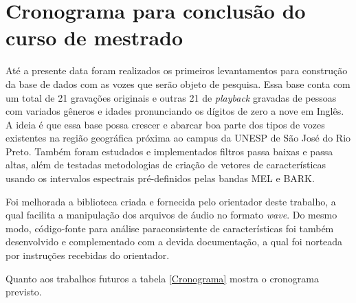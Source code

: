 \chapter{Cronograma para conclusão do curso de mestrado}
	\begin{myenv}{1.5}
		\par Até a presente data foram realizados os primeiros levantamentos para construção da base de dados com as vozes que serão objeto de pesquisa. Essa base conta com um total de 21 gravações originais e outras 21 de \textit{playback} gravadas de pessoas com variados gêneros e idades pronunciando os dígitos de zero a nove em Inglês. A ideia é que essa base possa crescer e abarcar boa parte dos tipos de vozes existentes na região geográfica próxima ao campus da UNESP de São José do Rio Preto. Também foram estudados e implementados filtros passa baixas e passa altas, além de testadas metodologias de criação de vetores de características usando os intervalos espectrais pré-definidos pelas bandas MEL e BARK. 
		\par Foi melhorada a biblioteca criada e fornecida pelo orientador deste trabalho, a qual facilita a manipulação dos arquivos de áudio no formato \textit{wave}. Do mesmo modo, código-fonte para análise paraconsistente de características foi também desenvolvido e complementado com a devida documentação, a qual foi norteada por instruções recebidas do orientador.
		\par Quanto aos trabalhos futuros a tabela \ref{Cronograma} mostra o cronograma previsto.
		
		\newcommand\ytl[2]{
			\parbox[b]{10em}{
				\hfill{\color{black}\bfseries\sffamily #1}~$\cdots\cdots$~
			}
			\makebox[0pt][c]{
				$\bullet$
			}\vrule\quad \parbox[c]{4.5cm}{
			\vspace{7pt}\color{black}\raggedright\sffamily #2.\\[7pt]
			}\\
			[-3pt]
		}
	

\end{myenv}
